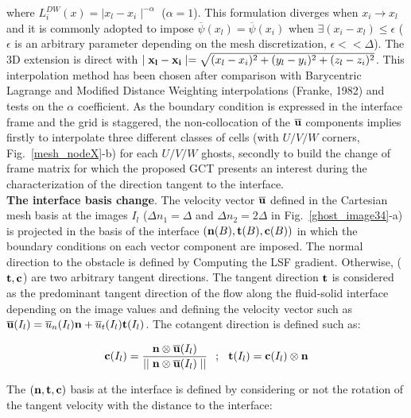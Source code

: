 where $L^{DW}_i(x)=\mid x_l-x_i \mid^{-\alpha}$ ($\alpha=1$). This formulation diverges when $x_i \rightarrow x_l$ and it is commonly adopted to impose $\overline{\psi}(x_l)=\overline{\psi}(x_i)$ when $\exists(x_i-x_l) \leq \epsilon$ ($\epsilon$ is an arbitrary parameter depending on the mesh discretization, $\epsilon<<\Delta$). The 3D extension is direct with $\mid {\bf x_l}-{\bf x_i} \mid=\sqrt{(x_l-x_i)^2+(y_l-y_i)^2+(z_l-z_i)^2}$. This interpolation method has been chosen after comparison with Barycentric Lagrange and Modified Distance Weighting interpolations (Franke, 1982) and tests on the $\alpha$ coefficient. As the boundary condition is expressed in the interface frame and the grid is staggered, the non-collocation of the $\overline{\bf u}$ components implies firstly to interpolate three different classes of cells (with $U/V/W$ corners, Fig.~\ref{mesh_nodeX}-b) for each $U/V/W$ ghosts, secondly to build the change of frame matrix for which the proposed GCT presents an interest during the characterization of the direction tangent to the interface.\\

{\bf The interface basis change}. The velocity vector ${\bf \overline{u}}$ defined in the Cartesian mesh basis at the images $I_l$ ($\Delta n_1=\Delta$ and $\Delta n_2=2\Delta$ in Fig.~\ref{ghost_image34}-a) is projected in the basis of the interface $({\bf n}(B),{\bf t}(B),{\bf c}(B))$ in which the boundary conditions on each vector component are imposed. The normal direction to the obstacle is defined by Computing the LSF gradient. Otherwise, (${\bf t},{\bf c}$) are two arbitrary tangent directions. The tangent direction ${\bf t}$ is considered as the predominant tangent direction of the flow along the fluid-solid interface depending on the image values and defining the velocity vector such as ${\bf \overline{u}}(I_l)=\overline{u}_n(I_l){\bf n}+\overline{u}_t(I_l){\bf t}(I_l)$. The cotangent direction is defined such as:

\vspace{-0.25cm}
\begin{equation}
	{\bf c}(I_l) = \frac{{\bf n}\otimes {\bf \overline{u}}(I_l)}{\mid\mid{\bf n}\otimes{\bf \overline{u}}(I_l)\mid\mid} \hspace{0.25cm} ; \hspace{0.25cm}
	{\bf t}(I_l) = {\bf c}(I_l)\otimes{\bf n}
\end{equation}
\vspace{-0.25cm}

The $({\bf n},{\bf t},{\bf c})$ basis at the interface is defined by considering or not the rotation of the tangent velocity with the distance to the interface:

